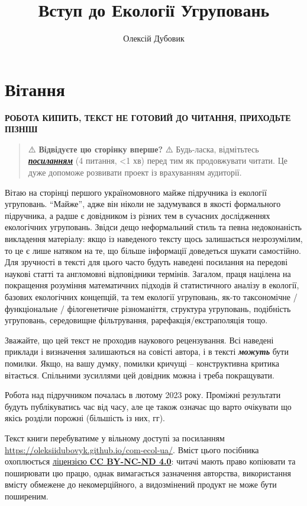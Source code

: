 \documentclass[
  11pt,
]{book}
\title{Вступ до Екології Угруповань}
\author{Олексій Дубовик}
\date{}
\begin{document}
\maketitle

{
\setcounter{tocdepth}{1}
\tableofcontents
}
\chapter*{Вітання}\label{intro}

\textbf{{РОБОТА КИПИТЬ, ТЕКСТ НЕ ГОТОВИЙ ДО ЧИТАННЯ, ПРИХОДЬТЕ ПІЗНІШ}}

\begin{quote}
⚠️ \textbf{{Відвідуєте цю сторінку вперше?}} ⚠️ Будь-ласка, відмітьтесь \href{https://forms.gle/9PxbV4Aqzn5kU1wZ7}{\textbf{\emph{посиланням}}} (4 питання, \textless1 хв) перед тим як продовжувати читати. Це дуже допоможе розвивати проект із врахуванням аудиторії.
\end{quote}

Вітаю на сторінці першого україномовного майже підручника із екології угруповань. ``Майже'', адже він ніколи не задумувався в якості формального підручника, а радше є довідником із різних тем в сучасних дослідженнях екологічних угруповань. Звідси дещо неформальний стиль та певна недоконаність викладення матеріалу: якщо із наведеного тексту щось залишається незрозумілим, то це є лише натяком на те, що більше інформації доведеться шукати самостійно. Для зручності в тексті для цього часто будуть наведені посилання на передові наукові статті та англомовні відповідники термінів. Загалом, праця націлена на покращення розуміння математичних підходів й статистичного аналізу в екології, базових екологічних концепцій, та тем екології угруповань, як-то таксономічне / функціональне / філогенетичне різноманіття, структура угруповань, подібність угруповань, середовищне фільтрування, рарефакція/екстраполяція тощо.

Зважайте, що цей текст не проходив наукового рецензування. Всі наведені приклади і визначення залишаються на совісті автора, і в тексті \textbf{\emph{можуть}} бути помилки. Якщо, на вашу думку, помилки кричущі -- конструктивна критика вітається. Спільними зусиллями цей довідник можна і треба покращувати.

Робота над підручником почалась в лютому 2023 року. Проміжні результати будуть публікуватись час від часу, але це також означає що варто очікувати що якісь розділи порожні (більшість із них, гг).

Текст книги перебуватиме у вільному доступі за посиланням \url{https://oleksiidubovyk.github.io/com-ecol-ua/}. Вміст цього посібника охоплюється \href{https://creativecommons.org/licenses/by-nc-nd/4.0/deed.en}{ліцензією \textbf{CC BY-NC-ND 4.0}}: читачі мають право копіювати та поширювати цю працю, однак вимагається зазначення авторства, використання вмісту обмежене до некомерційного, а видозмінений продукт не може бути поширеним.
\end{document}

